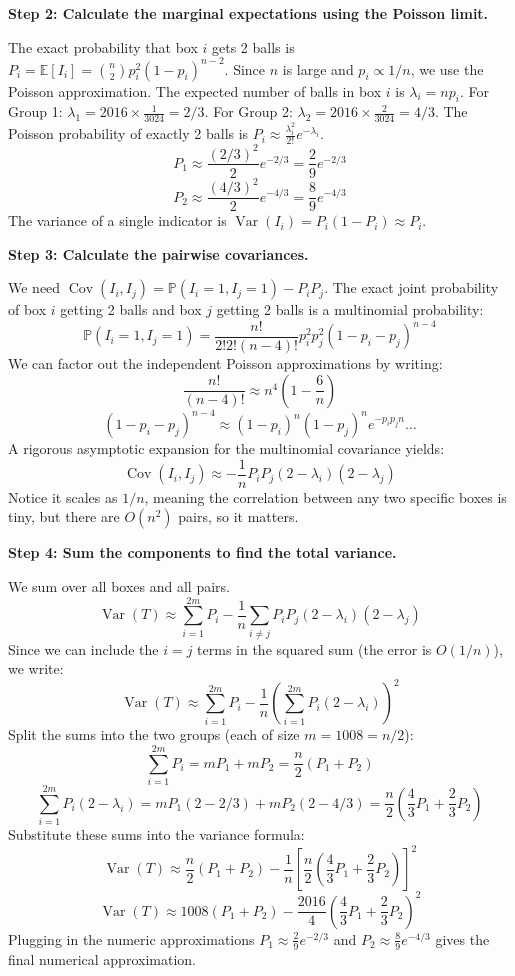 \begin{solution}
\textbf{Step 2: Calculate the marginal expectations using the Poisson limit.}

The exact probability that box $i$ gets 2 balls is $P_i = \mathbb{E}[I_i] = \binom{n}{2} p_i^2 (1-p_i)^{n-2}$.
Since $n$ is large and $p_i \propto 1/n$, we use the Poisson approximation. The expected number of balls in box $i$ is $\lambda_i = n p_i$.
For Group 1: $\lambda_1 = 2016 \times \frac{1}{3024} = 2/3$.
For Group 2: $\lambda_2 = 2016 \times \frac{2}{3024} = 4/3$.
The Poisson probability of exactly 2 balls is $P_i \approx \frac{\lambda_i^2}{2!} e^{-\lambda_i}$.
\[ P_1 \approx \frac{(2/3)^2}{2} e^{-2/3} = \frac{2}{9} e^{-2/3} \]
\[ P_2 \approx \frac{(4/3)^2}{2} e^{-4/3} = \frac{8}{9} e^{-4/3} \]
The variance of a single indicator is $\operatorname{Var}(I_i) = P_i(1-P_i) \approx P_i$.

\textbf{Step 3: Calculate the pairwise covariances.}

We need $\operatorname{Cov}(I_i, I_j) = \mathbb{P}(I_i=1, I_j=1) - P_i P_j$.
The exact joint probability of box $i$ getting 2 balls and box $j$ getting 2 balls is a multinomial probability:
\[ \mathbb{P}(I_i=1, I_j=1) = \frac{n!}{2! 2! (n-4)!} p_i^2 p_j^2 (1-p_i-p_j)^{n-4} \]
We can factor out the independent Poisson approximations by writing:
\[ \frac{n!}{(n-4)!} \approx n^4 \left( 1 - \frac{6}{n} \right) \]
\[ (1-p_i-p_j)^{n-4} \approx (1-p_i)^n (1-p_j)^n e^{-p_i p_j n} \dots \]
A rigorous asymptotic expansion for the multinomial covariance yields:
\[ \operatorname{Cov}(I_i, I_j) \approx -\frac{1}{n} P_i P_j (2-\lambda_i)(2-\lambda_j) \]
Notice it scales as $1/n$, meaning the correlation between any two specific boxes is tiny, but there are $O(n^2)$ pairs, so it matters.

\textbf{Step 4: Sum the components to find the total variance.}

We sum over all boxes and all pairs.
\[ \operatorname{Var}(T) \approx \sum_{i=1}^{2m} P_i - \frac{1}{n} \sum_{i \neq j} P_i P_j (2-\lambda_i)(2-\lambda_j) \]
Since we can include the $i=j$ terms in the squared sum (the error is $O(1/n)$), we write:
\[ \operatorname{Var}(T) \approx \sum_{i=1}^{2m} P_i - \frac{1}{n} \left( \sum_{i=1}^{2m} P_i (2-\lambda_i) \right)^2 \]
Split the sums into the two groups (each of size $m = 1008 = n/2$):
\[ \sum_{i=1}^{2m} P_i = m P_1 + m P_2 = \frac{n}{2}(P_1 + P_2) \]
\[ \sum_{i=1}^{2m} P_i (2-\lambda_i) = m P_1 (2 - 2/3) + m P_2 (2 - 4/3) = \frac{n}{2} \left( \frac{4}{3} P_1 + \frac{2}{3} P_2 \right) \]
Substitute these sums into the variance formula:
\[ \operatorname{Var}(T) \approx \frac{n}{2}(P_1 + P_2) - \frac{1}{n} \left[ \frac{n}{2} \left( \frac{4}{3} P_1 + \frac{2}{3} P_2 \right) \right]^2 \]
\[ \operatorname{Var}(T) \approx 1008(P_1 + P_2) - \frac{2016}{4} \left( \frac{4}{3} P_1 + \frac{2}{3} P_2 \right)^2 \]
Plugging in the numeric approximations $P_1 \approx \frac{2}{9} e^{-2/3}$ and $P_2 \approx \frac{8}{9} e^{-4/3}$ gives the final numerical approximation.
\end{solution}

